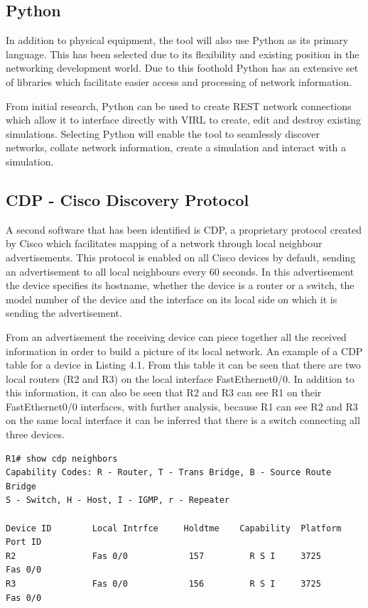 \documentclass[11pt]{report}
\begin{document}
\subsection{Python}

In addition to physical equipment, the tool will also use Python as its primary language. This has been selected due to its flexibility and existing position in the networking development world. Due to this foothold Python has an extensive set of libraries which facilitate easier access and processing of network information.

From initial research, Python can be used to create REST network connections which allow it to interface directly with VIRL to create, edit and destroy existing simulations. Selecting Python will enable the tool to seamlessly discover networks, collate network information, create a simulation and interact with a simulation.

\subsection{CDP - Cisco Discovery Protocol}

A second software that has been identified is CDP, a proprietary protocol created by Cisco which facilitates mapping of a network through local neighbour advertisements. This protocol is enabled on all Cisco devices by default, sending an advertisement to all local neighbours every 60 seconds. In this advertisement the device specifies its hostname, whether the device is a router or a switch, the model number of the device and the interface on its local side on which it is sending the advertisement. 

From an advertisement the receiving device can piece together all the received information in order to build a picture of its local network. An example of a CDP table for a device in Listing 4.1. From this table it can be seen that there are two local routers (R2 and R3) on the local interface FastEthernet0/0. In addition to this information, it can also be seen that R2 and R3 can see R1 on their FastEthernet0/0 interfaces, with further analysis, because R1 can see R2 and R3 on the same local interface it can be inferred that there is a switch connecting all three devices.

\begin{lstlisting}[caption=Example of Cisco CDP Neighbours]
R1# show cdp neighbors
Capability Codes: R - Router, T - Trans Bridge, B - Source Route Bridge
S - Switch, H - Host, I - IGMP, r - Repeater

Device ID        Local Intrfce     Holdtme    Capability  Platform  Port ID
R2               Fas 0/0            157         R S I     3725      Fas 0/0
R3               Fas 0/0            156         R S I     3725      Fas 0/0
\end{lstlisting}
\end{document}
